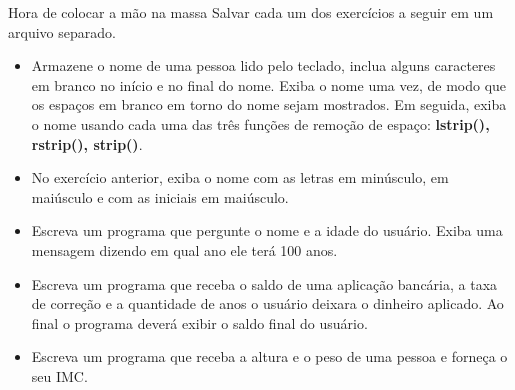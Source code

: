 \begin{frame}{Hora de colocar a mão na massa}
  Salvar cada um dos exercícios a seguir em um arquivo separado.
  \begin{itemize}
    \item Armazene o nome de uma pessoa lido pelo teclado, inclua alguns caracteres em branco no início e no final do nome. Exiba o nome uma vez, de modo que os espaços em branco em torno do nome sejam mostrados. Em seguida, exiba o nome usando cada uma das três funções de remoção de espaço: {\bf lstrip(), rstrip(), strip()}.
    \item No exercício anterior, exiba o nome com as letras em minúsculo, em maiúsculo e com as iniciais em maiúsculo.
    \item Escreva um programa que pergunte o nome e a idade do usuário. Exiba uma mensagem dizendo em qual ano ele terá 100 anos.
    \item Escreva um programa que receba o saldo de uma aplicação bancária, a taxa de correção e a quantidade de anos o usuário deixara o dinheiro aplicado. Ao final o programa deverá exibir o saldo final do usuário.
    \item Escreva um programa que receba a altura e o peso de uma pessoa e forneça o seu IMC.
  \end{itemize}
\end{frame}